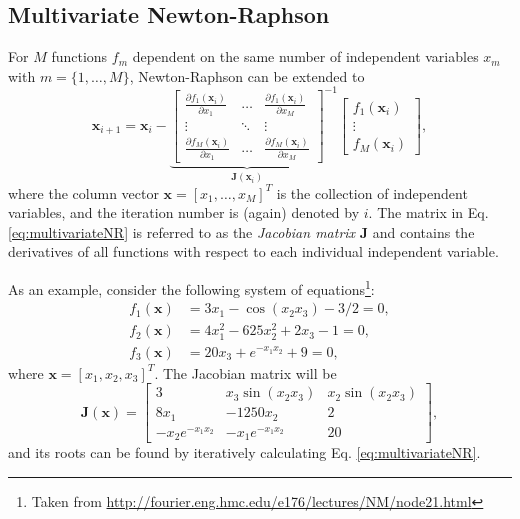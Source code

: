 \subsection{Multivariate Newton-Raphson}\label{sec:multivariateNR}
For $M$ functions $f_m$ dependent on the same number of independent variables $x_m$ with $m = \{1, \hdots, M\}$, Newton-Raphson can be extended to
\begin{equation}\label{eq:multivariateNR}
    \mathbf{x}_{i+1} = 
    \mathbf{x}_i - 
    {\underbrace{\begin{bmatrix}
        \frac{\partial f_1(\mathbf{x}_i)}{\partial x_1} & \hdots & \frac{\partial f_1(\mathbf{x}_i)}{\partial x_M}\\
        \vdots & \ddots & \vdots\\
        \frac{\partial f_M(\mathbf{x}_i)}{\partial x_1} & \hdots & \frac{\partial f_M(\mathbf{x}_i)}{\partial x_M}
    \end{bmatrix}}_{\mathbf{J}(\mathbf{x}_i)}}^{-1}
    \begin{bmatrix}
        f_1(\mathbf{x}_i)\\
        \vdots\\
        f_M(\mathbf{x}_i)
    \end{bmatrix},
\end{equation}
where the column vector $ \mathbf{x} = [x_1, \hdots, x_M]^T$ is the collection of independent variables, and the iteration number is (again) denoted by $i$.
The matrix in Eq. \eqref{eq:multivariateNR} is referred to as the \textit{Jacobian matrix} $\mathbf{J}$ and contains the derivatives of all functions with respect to each individual independent variable. 

As an example, consider the following system of equations\footnote{Taken from \url{http://fourier.eng.hmc.edu/e176/lectures/NM/node21.html}}:
\begin{subequations}
    \begin{align}
        f_1(\mathbf{x}) &= 3 x_1 - \cos(x_2x_3) - 3/2 = 0,\\
        f_2(\mathbf{x}) &= 4x_1^2 - 625 x_2^2 + 2x_3-1 = 0,\\
        f_3(\mathbf{x}) &= 20 x_3 + e^{-x_1x_2}+9 = 0,
    \end{align} 
\end{subequations}
where $\mathbf{x} = [x_1, x_2, x_3]^T$. The Jacobian matrix will be 
\begin{equation*}
    \mathbf{J}(\mathbf{x}) = \begin{bmatrix}
        3 & x_3 \sin (x_2x_3) & x_2 \sin(x_2x_3)\\
        8x_1 & -1250 x_2 & 2\\
        -x_2e^{-x_1x_2} & -x_1e^{-x_1x_2} & 20
    \end{bmatrix},
\end{equation*}
and its roots can be found by iteratively calculating Eq. \eqref{eq:multivariateNR}.

